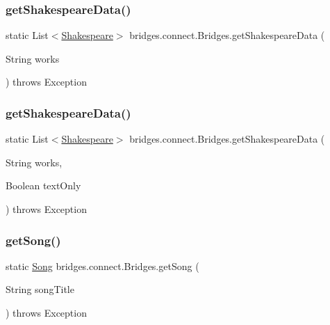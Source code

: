 \subsubsection{\texorpdfstring{get\+Shakespeare\+Data()}{getShakespeareData()}\hspace{0.1cm}{\footnotesize\ttfamily [2/3]}}
{\footnotesize\ttfamily static List$<$\mbox{\hyperlink{classbridges_1_1data__src__dependent_1_1_shakespeare}{Shakespeare}}$>$ bridges.\+connect.\+Bridges.\+get\+Shakespeare\+Data (\begin{DoxyParamCaption}\item[{String}]{works }\end{DoxyParamCaption}) throws Exception\hspace{0.3cm}{\ttfamily [static]}}

\mbox{\label{classbridges_1_1connect_1_1_bridges_aa81c312e631bc76fa49e0ccae66679dc}} 
\subsubsection{\texorpdfstring{get\+Shakespeare\+Data()}{getShakespeareData()}\hspace{0.1cm}{\footnotesize\ttfamily [3/3]}}
{\footnotesize\ttfamily static List$<$\mbox{\hyperlink{classbridges_1_1data__src__dependent_1_1_shakespeare}{Shakespeare}}$>$ bridges.\+connect.\+Bridges.\+get\+Shakespeare\+Data (\begin{DoxyParamCaption}\item[{String}]{works,  }\item[{Boolean}]{text\+Only }\end{DoxyParamCaption}) throws Exception\hspace{0.3cm}{\ttfamily [static]}}

\mbox{\label{classbridges_1_1connect_1_1_bridges_a7f65e6648f9e66a02343a39f2fc425cb}} 
\subsubsection{\texorpdfstring{get\+Song()}{getSong()}\hspace{0.1cm}{\footnotesize\ttfamily [1/2]}}
{\footnotesize\ttfamily static \mbox{\hyperlink{classbridges_1_1data__src__dependent_1_1_song}{Song}} bridges.\+connect.\+Bridges.\+get\+Song (\begin{DoxyParamCaption}\item[{String}]{song\+Title }\end{DoxyParamCaption}) throws Exception\hspace{0.3cm}{\ttfamily [static]}}

